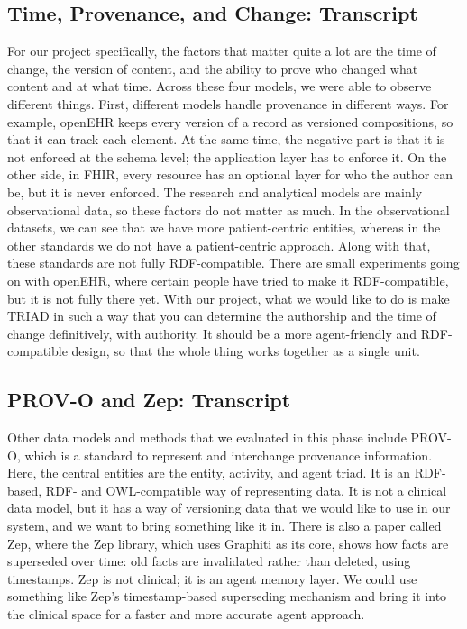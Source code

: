 \documentclass[sigconf]{acmart}
\begin{document}
\subsection{Time, Provenance, and Change: Transcript}
For our project specifically, the factors that matter quite a lot are the time
of change, the version of content, and the ability to prove who changed what
content and at what time. Across these four models, we were able to observe
different things. First, different models handle provenance in different ways.
For example, openEHR keeps every version of a record as versioned
compositions, so that it can track each element. At the same time, the
negative part is that it is not enforced at the schema level; the application
layer has to enforce it. On the other side, in FHIR, every resource has an
optional layer for who the author can be, but it is never enforced. The
research and analytical models are mainly observational data, so these
factors do not matter as much. In the observational datasets, we can see that
we have more patient-centric entities, whereas in the other standards we do
not have a patient-centric approach. Along with that, these standards are not
fully RDF-compatible. There are small experiments going on with openEHR, where
certain people have tried to make it RDF-compatible, but it is not fully there
yet. With our project, what we would like to do is make TRIAD in such a way
that you can determine the authorship and the time of change definitively,
with authority. It should be a more agent-friendly and RDF-compatible design,
so that the whole thing works together as a single unit.

\subsection{PROV-O and Zep: Transcript}
Other data models and methods that we evaluated in this phase include PROV-O,
which is a standard to represent and interchange provenance information. Here,
the central entities are the entity, activity, and agent triad. It is an
RDF-based, RDF- and OWL-compatible way of representing data. It is not a
clinical data model, but it has a way of versioning data that we would like to
use in our system, and we want to bring something like it in. There is also a
paper called Zep, where the Zep library, which uses Graphiti as its core, shows
how facts are superseded over time: old facts are invalidated rather than
deleted, using timestamps. Zep is not clinical; it is an agent memory layer.
We could use something like Zep's timestamp-based superseding mechanism and
bring it into the clinical space for a faster and more accurate agent
approach.
\end{document}
